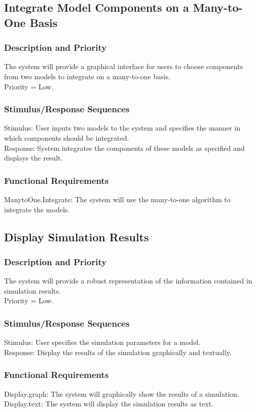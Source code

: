 \documentclass{article}
\begin{document}
\subsection{Integrate Model Components on a Many-to-One Basis}
\subsubsection{Description and Priority}
The system will provide a graphical interface for users to choose components from two models to integrate on a many-to-one basis.\\
Priority = Low.

\subsubsection{Stimulus/Response Sequences}
Stimulus: User inputs two models to the system and specifies the manner in which components should be integrated.\\
Response: System integrates the components of these models as specified and displays the result.

\subsubsection{Functional Requirements}
ManytoOne.Integrate: The system will use the many-to-one algorithm to integrate the models.

\subsection{Display Simulation Results}
\subsubsection{Description and Priority}
The system will provide a robust representation of the information contained in simulation results.\\
Priority = Low.

\subsubsection{Stimulus/Response Sequences}
Stimulus: User specifies the simulation parameters for a model.\\
Response: Display the results of the simulation graphically and textually.

\subsubsection{Functional Requirements}
Display.graph: The system will graphically show the results of a simulation.\\
Display.text: The system will display the simulation results as text.
\end{document}

